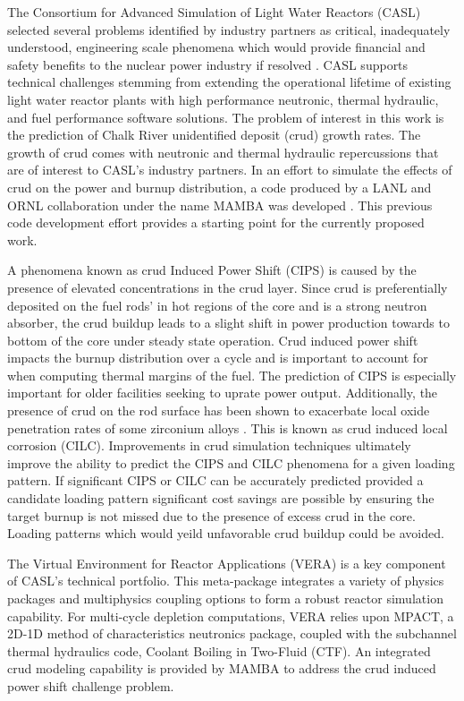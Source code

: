 
The Consortium for Advanced Simulation of Light Water Reactors (CASL) selected several problems identified by industry partners as critical, inadequately understood, engineering scale phenomena which would provide
financial and safety benefits to the nuclear power industry if resolved \cite{Turinsky15}.  CASL supports technical challenges stemming from extending the operational lifetime of existing light water reactor plants with high performance neutronic, thermal hydraulic, and fuel performance software solutions.
The problem of
interest in this work is the prediction of Chalk River unidentified deposit
(crud) growth rates.  The growth of crud comes with neutronic and thermal
hydraulic repercussions that are of interest to CASL's industry partners.
In an effort to simulate the
effects of crud on the power and burnup distribution, a code produced by a LANL
and ORNL collaboration under the name MAMBA was developed  \cite{collins16}.
This previous code development effort provides a starting point for the currently proposed work.

A phenomena known as crud Induced Power Shift (CIPS) is caused by the presence
of elevated  concentrations in the crud layer.  Since crud is preferentially
deposited on the fuel rods' in hot regions of the core and  is a strong neutron absorber, the crud buildup leads to a slight shift in
power production towards to bottom of the core under steady state operation.
Crud induced power shift impacts the burnup distribution over a cycle
and is important to account for when computing thermal
margins of the fuel.  The prediction
of CIPS is especially important for older facilities seeking to uprate power
output.  Additionally, the presence of crud on the rod surface has been shown
to exacerbate local oxide penetration rates of some zirconium alloys \cite{adamson07}.
This is known as crud induced local corrosion (CILC).  Improvements in crud
simulation techniques ultimately improve the ability to predict the CIPS and
CILC phenomena for a given loading pattern.  If significant CIPS or CILC can be accurately predicted provided a candidate loading pattern significant cost savings are possible by ensuring the target burnup is not missed due to the presence of excess crud in the core.  Loading patterns which would yeild unfavorable crud buildup could be avoided.

The Virtual Environment for Reactor Applications (VERA) is a key component of
CASL's technical portfolio.  This meta-package integrates a variety of physics
packages and multiphysics coupling options to form a robust reactor simulation
capability.  For multi-cycle depletion computations, VERA relies upon MPACT, a
2D-1D method of characteristics neutronics package, coupled with the subchannel
thermal hydraulics code, Coolant Boiling in Two-Fluid (CTF).  An integrated crud modeling capability
is provided by MAMBA to address the crud induced power shift challenge problem.

